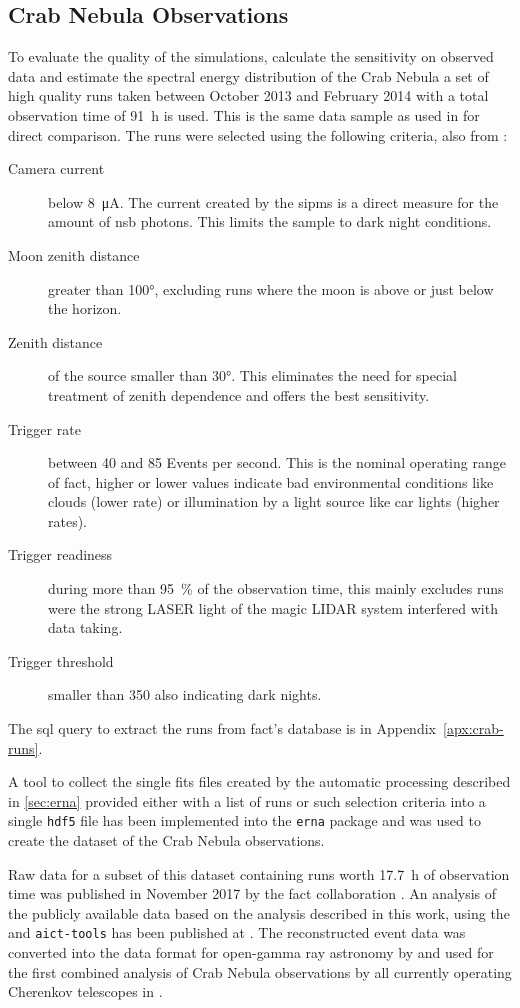 \subsection{Crab Nebula Observations}
To evaluate the quality of the simulations, calculate the sensitivity
on observed data and estimate the spectral energy distribution 
of the Crab Nebula a set of high quality runs taken between October 2013 and February
2014 with a total observation time of \SI{91}{\hour} is used.
This is the same data sample as used in \cite{phd-temme} for direct comparison.
The runs were selected using the following criteria, also from \cite{phd-temme}:
\begin{description}
  \item[Camera current] below \SI{8}{\micro\ampere}. The current created by the
    \glspl{sipm} is a direct measure for the amount of \gls{nsb} photons.
    This limits the sample to dark night conditions.
  \item[Moon zenith distance] greater than \ang{100}, excluding runs where
    the moon is above or just below the horizon.
  \item[Zenith distance] of the source smaller than \ang{30}.
    This eliminates the need for special treatment of zenith dependence and offers the best sensitivity.
  \item[Trigger rate] between 40 and 85 Events per second. This is the nominal operating
    range of \gls{fact}, higher or lower values indicate bad environmental conditions
    like clouds (lower rate) or illumination by a light source like car lights (higher rates).
  \item[Trigger readiness] during more than \SI{95}{\percent} of the observation time,
    this mainly excludes runs were the strong LASER light of the \gls{magic} LIDAR system
    interfered with data taking.
  \item[Trigger threshold] smaller than \num{350} also indicating dark nights.
\end{description}
The \gls{sql} query to extract the runs from \gls{fact}'s database is in Appendix~\ref{apx:crab-runs}.

A tool to collect the single \gls{fits} files created by the automatic processing
described in \autoref{sec:erna} provided either with a list of runs or such selection
criteria into a single \texttt{hdf5} file has been implemented into the \texttt{erna} package
and was used to create the dataset of the Crab Nebula observations.

Raw data for a subset of this dataset containing runs worth \SI{17.7}{\hour} of observation time
was published in November 2017 by the \gls{fact} collaboration \cite{fact-open-data}.
An analysis of the publicly available data based on the analysis described in this work,
using the \facttools{} and \texttt{aict-tools} has been published at \cite{open-data-analysis}.
The reconstructed event data was converted into the 
data format for open-gamma ray astronomy \cite{ogadf} by \cite{phd-bruegge} and used for the first
combined analysis of Crab Nebula observations by all currently operating Cherenkov
telescopes in \cite{open-crab}.


